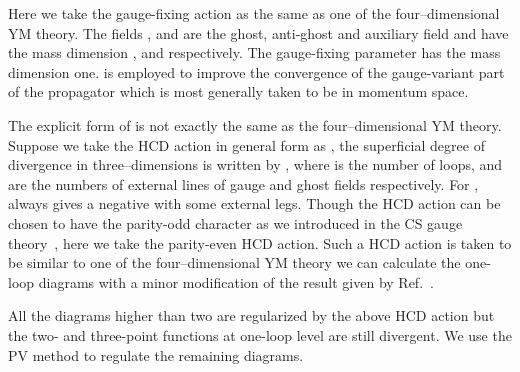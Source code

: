 \documentclass[a4paper,12pt]{article}
\begin{document}
%
Here we take the gauge-fixing action \coordHE{}
as the same as one of the four--dimensional YM theory.
%
The fields \coordHE{}, \coordHE{} and \coordHE{}
are the ghost, anti-ghost and auxiliary field
and have the mass dimension \coordHE{}, \coordHE{} and \coordHE{} 
respectively.
%
The gauge-fixing parameter \coordHE{} has the mass dimension one.
%
\coordHE{} is employed
to improve the convergence of the gauge-variant part of the propagator
which is most generally taken to be 
\coordHE{} in momentum space.
%

%
The explicit form of \coordHE{} is not exactly the same as 
the four--dimensional YM theory.
%
Suppose we take the HCD action in general form as
\coordHE{},
the superficial degree of divergence \myHighlight{$\omega$}\coordHE{}
in three--dimensions is written by
\coordHE{},
where \coordHE{} is the number of loops, 
\coordHE{} and \coordHE{} are the numbers of external lines of
gauge and ghost fields respectively.
For \coordHE{}, \coordHE{} always gives a negative \myHighlight{$\omega$}\coordHE{}
with some external legs.
%
Though the HCD action can be chosen to have the parity-odd character
as we introduced in the CS gauge theory~\cite{Nittoh:1998ey},
here we take the parity-even HCD action.
%
Such a HCD action is taken to be similar to
one of the four--dimensional YM theory
we can calculate the one-loop diagrams
with a minor modification of the result given by Ref.~\cite{Nittoh:2000it}.



All the diagrams higher than two are regularized by the above HCD action
but the two- and three-point functions at one-loop level are still divergent.
We use the PV method to regulate the remaining diagrams.
\end{document}
